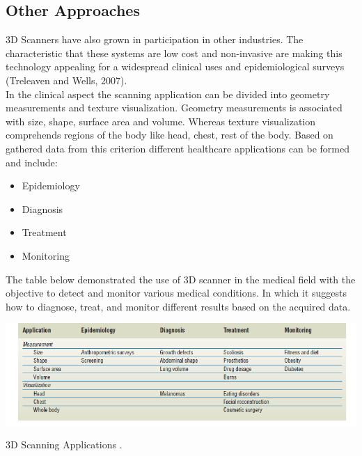 \documentclass[a4paper]{thesis}
\begin{document}
 \subsection*{Other Approaches}
 3D Scanners have also grown in participation in other industries. The  characteristic that these systems are low cost and non-invasive are making this technology  appealing for a widespread clinical uses and epidemiological surveys (Treleaven and Wells, 2007).\\[10pt]
 In the clinical aspect the scanning application can be divided into geometry measurements and texture visualization. 
 Geometry measurements is associated with size, shape, surface area and volume. Whereas texture visualization comprehends regions of the body like head, chest, rest of the body.
 Based on gathered data from this criterion different healthcare applications can be formed and include: 
\begin{itemize}[]
    \itemsep0em 
    \item Epidemiology
    \item Diagnosis
    \item Treatment
    \item Monitoring
\end{itemize}
The table below demonstrated the use of 3D scanner in the medical field with the objective to detect and monitor various medical conditions. In which it suggests how to diagnose, treat, and monitor different results based on the acquired data.
\begin{table}[ht]
    \centering
    \includegraphics[width=17cm]{table1.png}
    \caption{3D Scanning Applications \cite[]{treleaven_wells_2007}.}
\end{table}
\end{document}
